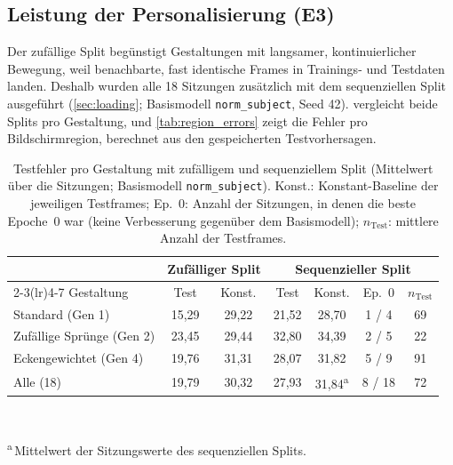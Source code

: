 \documentclass[
  11pt,
  a4paper,
  oneside,
  DIV=12,
  BCOR=8mm,
  parskip=half,
  headings=normal,
  bibliography=totoc,
  listof=totoc
]{scrreprt}
\newcommand{\code}[1]{\texttt{#1}}
\begin{document}
\subsection{Leistung der Personalisierung (E3)}
\label{sec:design_performance}

Der zufällige Split begünstigt Gestaltungen mit langsamer, kontinuierlicher
Bewegung, weil benachbarte, fast identische Frames in Trainings- und
Testdaten landen. Deshalb wurden alle 18 Sitzungen zusätzlich mit dem
sequenziellen Split ausgeführt (\cref{sec:loading}; Basismodell
\code{norm\_subject}, Seed 42).  vergleicht beide Splits
pro Gestaltung, und \cref{tab:region_errors} zeigt die Fehler pro
Bildschirmregion, berechnet aus den gespeicherten Testvorhersagen.

\begin{table}[htbp]
  \centering
  \caption{Testfehler pro Gestaltung mit zufälligem und sequenziellem Split
           (Mittelwert über die Sitzungen; Basismodell \code{norm\_subject}).
           Konst.: Konstant-Baseline der jeweiligen Testframes; Ep.~0: Anzahl
           der Sitzungen, in denen die beste Epoche~0 war (keine Verbesserung
           gegenüber dem Basismodell); $n_{\text{Test}}$: mittlere Anzahl der
           Testframes.}
  \label{tab:design_perf}
  \footnotesize
  \setlength{\tabcolsep}{4pt}
  \begin{tabular}{l cc cccc}
    \toprule
    & \multicolumn{2}{c}{Zufälliger Split} & \multicolumn{4}{c}{Sequenzieller Split} \\
    \cmidrule(lr){2-3}\cmidrule(lr){4-7}
    Gestaltung & Test & Konst. & Test & Konst. & Ep.~0 & $n_{\text{Test}}$ \\
    \midrule
    Standard (Gen 1)          & 15,29 & 29,22 & 21,52 & 28,70 & 1 / 4 & 69 \\
    Zufällige Sprünge (Gen 2) & 23,45 & 29,44 & 32,80 & 34,39 & 2 / 5 & 22 \\
    Eckengewichtet (Gen 4)    & 19,76 & 31,31 & 28,07 & 31,82 & 5 / 9 & 91 \\
    \midrule
    Alle (18)                 & 19,79 & 30,32 & 27,93 & 31,84\textsuperscript{a} & 8 / 18 & 72 \\
    \bottomrule
  \end{tabular}\\[1mm]
  \parbox{0.9\linewidth}{\footnotesize \textsuperscript{a}\,Mittelwert der
  Sitzungswerte des sequenziellen Splits.}
\end{table}
\end{document}
